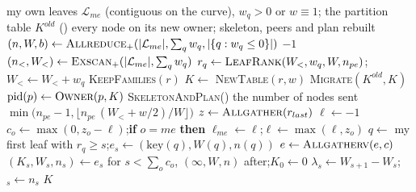 \begin{algorithm}[H]
  \caption{: the cut, then one move}
  \label{alg:repart}
  \begin{algorithmic}[1]
    \Require my own leaves $\mathcal{L}_{me}$ (contiguous on the curve), $w_q
      > 0$ or $w \equiv 1$; the partition table $K^{old}$
      ()
    \Ensure every node on its new owner; skeleton, peers and plan rebuilt
    \State $(n, W, b) \gets \textsc{Allreduce}_{+}(|\mathcal{L}_{me}|,
      \sum_q w_q, |\{q : w_q \le 0\}|)$ 
      \State \Return $-1$ 
    \EndIf
    \State $(n_{<}, W_{<}) \gets \textsc{Exscan}_{+}(|\mathcal{L}_{me}|,
      \sum_q w_q)$ 
      \State $r_q \gets \textsc{LeafRank}(W_{<}, w_q, W, n_{pe})$;\quad
        $W_{<} \gets W_{<} + w_q$
    \EndFor
    \State \textsc{KeepFamilies}$(r)$ 
    \State $K \gets$ \textsc{NewTable}$(r, w)$
    \State \textsc{Migrate}$(K^{old}, K)$ 
      \State $\mathrm{pid}(p) \gets \textsc{Owner}(p, K)$
    \EndFor
    \State \textsc{SkeletonAndPlan}() 
    \State \Return the number of nodes sent
    \Statex
      \State \Return $\min\big(n_{pe} - 1, \lfloor n_{pe}\,(W_{<} + w/2) / W \rfloor\big)$
    \EndFunction
    \Statex
     
      \State $z \gets \textsc{Allgather}(r_{last})$ 
      \State $\ell \gets -1$
        \State $c_o \gets \max(0, z_o - \ell)$;\quad \textbf{if} $o =
          me$ \textbf{then} $\ell_{me} \gets \ell$;\quad $\ell \gets
          \max(\ell, z_o)$
      \EndFor
        \State $q \gets$ my first leaf with $r_q \ge s$;\quad $e_s \gets
          (\mathrm{key}(q), W(q), n(q))$ 
      \EndFor
      \State $e \gets \textsc{Allgatherv}(e, c)$ 
      \State $(K_s, W_s, n_s) \gets e_s$ for $s < \sum_o c_o$, $(\infty, W, n)$
        after;\quad $K_0 \gets 0$
      \State $\lambda_s \gets W_{s+1} - W_s$;\quad {}$_s
        \gets n_s$
      \State \Return $K$
    \EndFunction
  \end{algorithmic}
\end{algorithm}

